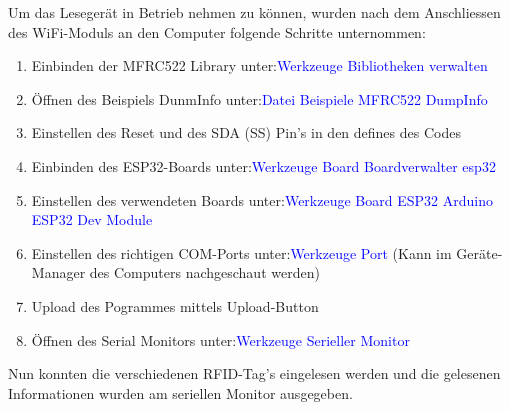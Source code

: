 Um das Lesegerät in Betrieb nehmen zu können, wurden nach dem Anschliessen des WiFi-Moduls an den Computer folgende Schritte unternommen: 

\begin{enumerate}
\item Einbinden der MFRC522 Library unter:\newline\textcolor{blue}{Werkzeuge \textrightarrow Bibliotheken verwalten} \newline
\item Öffnen des Beispiels DunmInfo unter:\newline\textcolor{blue}{Datei \textrightarrow Beispiele \textrightarrow MFRC522 \textrightarrow DumpInfo} \newline
\item Einstellen des Reset und des SDA (SS) Pin's in den defines des Codes\newline
\item Einbinden des ESP32-Boards unter:\newline\textcolor{blue}{Werkzeuge \textrightarrow Board \textrightarrow Boardverwalter \textrightarrow esp32} \newline
\item Einstellen des verwendeten Boards unter:\newline\textcolor{blue}{Werkzeuge \textrightarrow Board \textrightarrow ESP32 Arduino \textrightarrow ESP32 Dev Module} \newline
\item Einstellen des richtigen COM-Ports unter:\newline\textcolor{blue}{Werkzeuge \textrightarrow Port} (Kann im Geräte-Manager des Computers nachgeschaut werden) \newline
\item Upload des Pogrammes mittels Upload-Button \newline
\item Öffnen des Serial Monitors unter:\newline\textcolor{blue}{Werkzeuge \textrightarrow  Serieller Monitor} \newline
\end{enumerate}

Nun konnten die verschiedenen RFID-Tag's eingelesen werden und  die gelesenen Informationen wurden am seriellen Monitor ausgegeben. \cite{pcbreflux_esp32_2017}